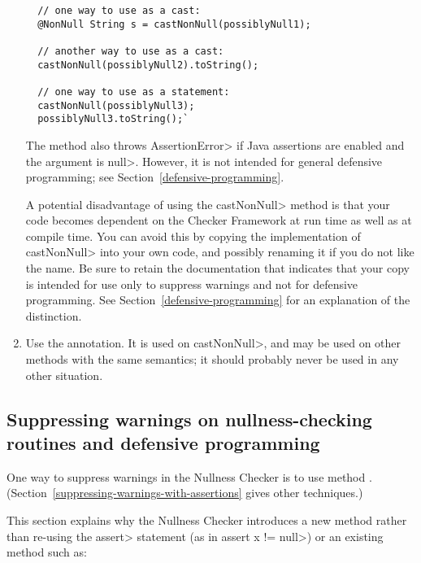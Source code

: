 \begin{enumerate}
\begin{Verbatim}
  // one way to use as a cast:
  @NonNull String s = castNonNull(possiblyNull1);

  // another way to use as a cast:
  castNonNull(possiblyNull2).toString();

  // one way to use as a statement:
  castNonNull(possiblyNull3);
  possiblyNull3.toString();`
\end{Verbatim}

  The method also throws \<AssertionError> if Java assertions are enabled and
  the argument is \<null>.  However, it is not intended for general defensive
  programming; see Section~\ref{defensive-programming}.

  A potential disadvantage of using the \<castNonNull> method is that your
  code becomes dependent on the Checker Framework at run time as well as at
  compile time.  You can avoid this by copying the implementation of
  \<castNonNull> into your own code, and possibly renaming it if you do not
  like the name.  Be sure to retain the documentation that indicates that
  your copy is intended for use only to suppress warnings and not for
  defensive programming.  See Section~\ref{defensive-programming} for an
  explanation of the distinction.

\item
  Use the 
  annotation.  It is used on \<castNonNull>, and may be used on other
  methods with the same semantics; it should probably never be used in any
  other situation.

\end{enumerate}


\subsection{Suppressing warnings on nullness-checking routines and defensive programming\label{defensive-programming}}

%


One way to suppress warnings in the Nullness Checker is to use
method .
(Section~\ref{suppressing-warnings-with-assertions} gives other techniques.)

This section explains why the Nullness Checker introduces a new method
rather than re-using the \<assert> statement (as in
\<assert x != null>) or an existing method such as:

